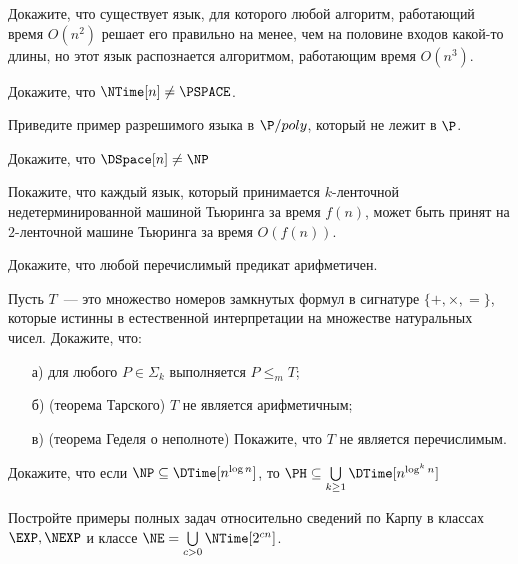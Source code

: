 

\begin{task}
	Докажите, что существует язык, для которого любой алгоритм, работающий время $O(n^2)$ решает его правильно на менее, чем на
    половине входов какой-то длины, но этот язык распознается алгоритмом, работающим время $O(n^3)$.
\end{task}

\begin{task}
	Докажите, что ${\NTime}[n] \neq \PSPACE$.
\end{task}

\begin{task}
	Приведите пример разрешимого языка в $\P/poly$, который не лежит в $\P$. 
\end{task}

\begin{task}
	Докажите, что $\DSpace[n] \neq \NP$
\end{task}


\breakline

\begin{ptask}{8}
    Покажите, что каждый язык, который принимается $k$-ленточной недетерминированной машиной Тьюринга за время $f(n)$, может быть
    принят на $2$-ленточной машине Тьюринга за время $O(f(n))$.
\end{ptask}

\begin{ptask}{23}
	Докажите, что любой перечислимый предикат арифметичен. 
\end{ptask}


\begin{ptask}{30}
	Пусть $T$~--- это множество номеров замкнутых формул в сигнатуре $\{+, \times, {=\}}$, которые истинны в естественной
    интерпретации на множестве натуральных чисел. Докажите, что:
    \begin{enumerate}[topsep = 0pt, itemsep = -1ex]
        \item [а)] для любого $P \in \Sigma_k$ выполняется $P \le_m T$;
        \item [б)] (теорема Тарского) $T$ не является арифметичным;
        \item [в)] (теорема Геделя о неполноте) Покажите, что $T$ не является перечислимым.
    \end{enumerate}
\end{ptask}

\begin{ptask}{32}
	Докажите, что если $\NP \subseteq \DTime[n^{\log n}]$, то $\PH \subseteq \bigcup\limits_{k \ge 1} \DTime[n^{\log^k n}]$    
\end{ptask}


\begin{ptask}{35}
	Постройте примеры полных задач относительно сведений по Карпу в классах $\EXP, \NEXP$ и классе $\NE = \bigcup\limits_{c > 0}
    \NTime[2^{cn}]$.
\end{ptask}
